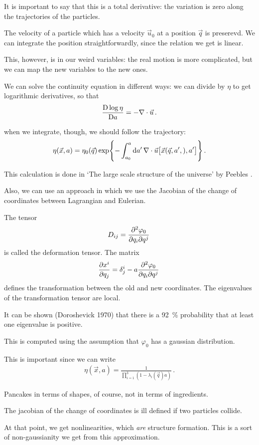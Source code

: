 \documentclass[main.tex]{subfiles}
\begin{document}
It is important to say that this is a total derivative: the variation is zero along the trajectories of the particles.

The velocity of a particle which has a velocity \(\vec{u}_{0}\) at a position \(\vec{q}\) is preserevd. We can integrate the position straightforwardly, since the relation we get is linear.

This, however, is in our weird variables: the real motion is more complicated, but we can map the new variables to the new ones.

We can solve the continuity equation in different ways: we can divide by \(\eta \) to get logarithmic derivatives, so that 
%
\begin{align}
\frac{\mathrm{D} \log \eta }{\mathrm{D} a} =  -\nabla \cdot \vec{u}
\,.
\end{align}

when we integrate, though, we should follow the trajectory: 
%
\begin{align}
\eta (\vec{x}, a) = \eta_0 (\vec{q}) \exp{ - \int_{a_0 }^{a} \dd{a'} \nabla \cdot \vec{u} \qty[\vec{x}(\vec{q}, a',), a']}
\,.
\end{align}

This calculation is done in `The large scale structure of the universe' by Peebles \cite[]{peeblesLargescaleStructureUniverse1980}.

Also, we can use an approach in which we use the Jacobian of the change of coordinates between Lagrangian and Eulerian.

The tensor 
%
\begin{align}
D_{ij} = \pdv[2]{\varphi_0}{q_{i}}{q^{j}}
\,
\end{align}
%
is called the deformation tensor.
The matrix 
%
\begin{align}
\pdv{x^{i}}{q_{j}} = \delta^{i}_{j} - a \pdv[2]{\varphi_0}{q_{i}}{q^{j}}
\,
\end{align}
%
defines the transformation between the old and new coordinates.
The eigenvalues of the transformation tensor are local. 

It can be shown (Doroshevick 1970) that there is a \SI{92}{\percent} probability that at least one eigenvalue is positive.

This is computed using the assumption that \(\varphi_0 \) has a gaussian distribution.

This is important since we can write 
%
\begin{align}
\eta (\vec{x}, a) = \frac{1}{\prod_{i=1}^{3} (1 - \lambda_{i}(\vec{q}) a)}
\,.
\end{align}

Pancakes in terms of shapes, of course, not in terms of ingredients.

The jacobian of the change of coordinates is ill defined if two particles collide. 

At that point, we get nonlinearities, which \emph{are} structure formation.
This is a sort of non-gaussianity we get from this approximation.
\end{document}
